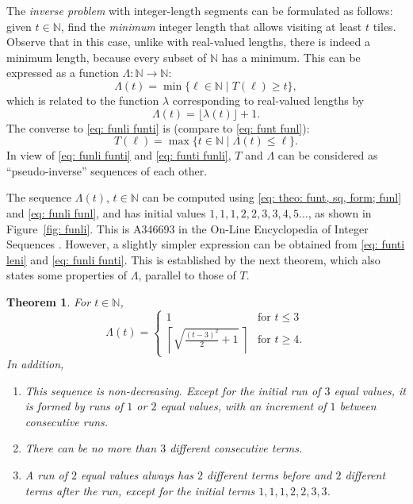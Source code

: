 \documentclass[12pt, a4paper]{article}
\newcommand{\st}{\mid}%
\newcommand{\funl}{\lambda} %
\newcommand{\funti}{T} %
\newcommand{\funli}{\Lambda} %
\newcommand{\leni}{\ell} %
\newcommand{\tiles}{t} %
\newtheorem{theorem}{Theorem}%
\begin{document}
The \emph{inverse problem} with integer-length segments can be formulated as follows: given $\tiles \in \mathbb N$, find the \emph{minimum} integer length that allows visiting at least $\tiles$ tiles. Observe that in this case, unlike with real-valued lengths, there is indeed a minimum length, because every subset of $\mathbb N$ has a minimum. This can be expressed as a function $\funli: \mathbb N \to \mathbb N$:
\begin{equation}
\label{eq: funli funti}
\funli(\tiles) = \min\{\leni \in \mathbb N \st \funti(\leni) \geq \tiles\},
\end{equation}
which is related to the function $\funl$ corresponding to real-valued lengths by
\begin{equation}
\label{eq: funli funl}
\funli(\tiles) = \lfloor\funl(\tiles)\rfloor + 1.
\end{equation}
The converse to \eqref{eq: funli funti} is (compare to \eqref{eq: funt funl}):
\begin{equation}
\label{eq: funti funli}
\funti(\leni) = \max \{\tiles \in \mathbb N \st \funli(\tiles) \leq \leni\}.
\end{equation}
In view of \eqref{eq: funli funti} and \eqref{eq: funti funli}, $\funti$ and $\funli$ can be considered as ``pseudo-inverse'' sequences of each other.

The sequence $\funli(\tiles)$, $\tiles \in \mathbb N$ can be computed using \eqref{eq: theo: funt, sq, form; funl} and \eqref{eq: funli funl}, and has initial values $1, 1, 1, 2, 2, 3, 3, 4, 5 \ldots$, as shown in Figure~\ref{fig: funli}. This is A346693 in the On-Line Encyclopedia of Integer Sequences \cite{OEIS_unitsq_int_inv}. However, a slightly simpler expression can be obtained from \eqref{eq: funti leni} and \eqref{eq: funli funti}. This is established by the next theorem, which also states some properties of $\funli$, parallel to those of $\funti$.

\begin{theorem}
\label{theo: funli}
For $\tiles \in \mathbb N$,
\begin{equation}
\label{eq: funli}
\funli(\tiles) = \begin{cases}
\displaystyle
1 & \text{for } \tiles \leq 3 \\[1.3mm]
\displaystyle
\left \lceil \sqrt{\frac{(\tiles-3)^2} 2 + 1} \ \right \rceil & \text{for } \tiles \geq 4.
\end{cases}
\end{equation}
In addition,
\begin{enumerate}
\item
This sequence is non-decreasing. Except for the initial run of $3$ equal values, it is formed by runs of $1$ or $2$ equal values, with an increment of $1$ between consecutive runs.
\item
There can be no more than $3$ different consecutive terms.
\item
A run of $2$ equal values always has $2$ different terms before and $2$ different terms after the run, except for the initial terms $1, 1, 1, 2, 2, 3, 3$.
\end{enumerate}
\end{theorem}
\end{document}
